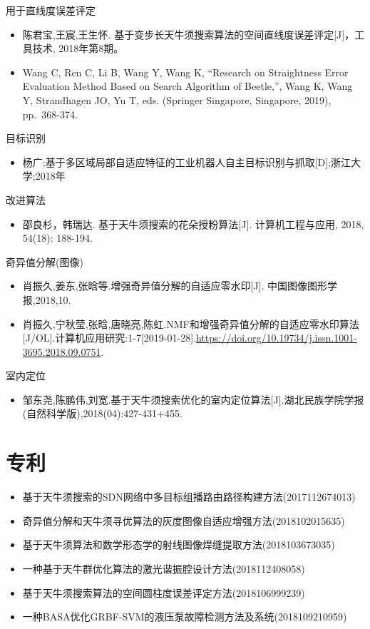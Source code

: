 \documentclass[]{ctexbook}
\providecommand{\tightlist}{%
  \setlength{\itemsep}{0pt}\setlength{\parskip}{0pt}}
\begin{document}
用于直线度误差评定

\begin{itemize}
\tightlist
\item
  陈君宝,王宸,王生怀.
  基于变步长天牛须搜索算法的空间直线度误差评定{[}J{]}，工具技术,
  2018年第8期。
\item
  Wang C, Ren C, Li B, Wang Y, Wang K, ``Research on Straightness Error
  Evaluation Method Based on Search Algorithm of Beetle,'', Wang K, Wang
  Y, Strandhagen JO, Yu T, eds. (Springer Singapore, Singapore, 2019),
  pp.~368-374.
\end{itemize}

目标识别

\begin{itemize}
\tightlist
\item
  杨广;基于多区域局部自适应特征的工业机器人自主目标识别与抓取{[}D{]};浙江大学;2018年
\end{itemize}

改进算法

\begin{itemize}
\tightlist
\item
  邵良杉，韩瑞达. 基于天牛须搜索的花朵授粉算法{[}J{]}. 计算机工程与应用,
  2018, 54(18): 188-194.
\end{itemize}

奇异值分解(图像)

\begin{itemize}
\tightlist
\item
  肖振久,姜东,张晗等.增强奇异值分解的自适应零水印{[}J{]}.
  中国图像图形学报,2018,10.
\item
  肖振久,宁秋莹,张晗,唐晓亮,陈虹.NMF和增强奇异值分解的自适应零水印算法{[}J/OL{]}.计算机应用研究:1-7{[}2019-01-28{]}.\url{https://doi.org/10.19734/j.issn.1001-3695.2018.09.0751}.
\end{itemize}

室内定位

\begin{itemize}
\tightlist
\item
  邹东尧,陈鹏伟,刘宽.基于天牛须搜索优化的室内定位算法{[}J{]}.湖北民族学院学报(自然科学版),2018(04):427-431+455.
\end{itemize}

\section{专利}

\begin{itemize}
\tightlist
\item
  基于天牛须搜索的SDN网络中多目标组播路由路径构建方法(2017112674013)
\item
  奇异值分解和天牛须寻优算法的灰度图像自适应增强方法(2018102015635)
\item
  基于天牛须算法和数学形态学的射线图像焊缝提取方法(2018103673035)
\item
  一种基于天牛群优化算法的激光谐振腔设计方法(2018112408058)
\item
  基于天牛须搜索算法的空间圆柱度误差评定方法(2018106999239)
\item
  一种BASA优化GRBF-SVM的液压泵故障检测方法及系统(2018109210959)
\end{itemize}
\end{document}
